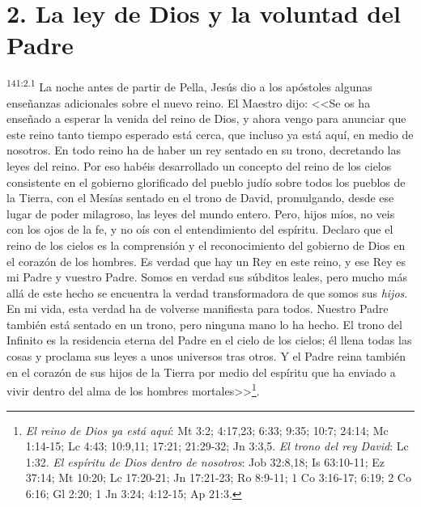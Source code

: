 \section*{2. La ley de Dios y la voluntad del Padre}
\par 
\textsuperscript{141:2.1} La noche antes de partir de Pella, Jesús dio a los apóstoles algunas enseñanzas adicionales sobre el nuevo reino. El Maestro dijo: <<Se os ha enseñado a esperar la venida del reino de Dios, y ahora vengo para anunciar que este reino tanto tiempo esperado está cerca, que incluso ya está aquí, en medio de nosotros. En todo reino ha de haber un rey sentado en su trono, decretando las leyes del reino. Por eso habéis desarrollado un concepto del reino de los cielos consistente en el gobierno glorificado del pueblo judío sobre todos los pueblos de la Tierra, con el Mesías sentado en el trono de David, promulgando, desde ese lugar de poder milagroso, las leyes del mundo entero. Pero, hijos míos, no veis con los ojos de la fe, y no oís con el entendimiento del espíritu. Declaro que el reino de los cielos es la comprensión y el reconocimiento del gobierno de Dios en el corazón de los hombres. Es verdad que hay un Rey en este reino, y ese Rey es mi Padre y vuestro Padre. Somos en verdad sus súbditos leales, pero mucho más allá de este hecho se encuentra la verdad transformadora de que somos sus \textit{hijos}. En mi vida, esta verdad ha de volverse manifiesta para todos. Nuestro Padre también está sentado en un trono, pero ninguna mano lo ha hecho. El trono del Infinito es la residencia eterna del Padre en el cielo de los cielos; él llena todas las cosas y proclama sus leyes a unos universos tras otros. Y el Padre reina también en el corazón de sus hijos de la Tierra por medio del espíritu que ha enviado a vivir dentro del alma de los hombres mortales>>\footnote{\textit{El reino de Dios ya está aquí}: Mt 3:2; 4:17,23; 6:33; 9:35; 10:7; 24:14; Mc 1:14-15; Lc 4:43; 10:9,11; 17:21; 21:29-32; Jn 3:3,5. \textit{El trono del rey David}: Lc 1:32. \textit{El espíritu de Dios dentro de nosotros}: Job 32:8,18; Is 63:10-11; Ez 37:14; Mt 10:20; Lc 17:20-21; Jn 17:21-23; Ro 8:9-11; 1 Co 3:16-17; 6:19; 2 Co 6:16; Gl 2:20; 1 Jn 3:24; 4:12-15; Ap 21:3.}.

